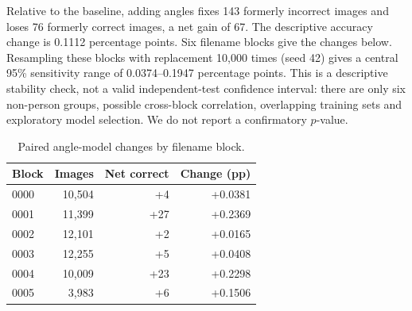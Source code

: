 Relative to the baseline, adding angles fixes 143 formerly incorrect images and loses 76 formerly correct images, a net gain of 67. The descriptive accuracy change is 0.1112 percentage points. Six filename blocks give the changes below. Resampling these blocks with replacement 10,000 times (seed 42) gives a central 95\% sensitivity range of 0.0374--0.1947 percentage points. This is a descriptive stability check, not a valid independent-test confidence interval: there are only six non-person groups, possible cross-block correlation, overlapping training sets and exploratory model selection. We do not report a confirmatory $p$-value.
\begin{table}[h]\centering\caption{Paired angle-model changes by filename block.}\begin{tabular}{lrrr}\toprule
Block & Images & Net correct & Change (pp)\\\midrule
0000 & 10,504 & +4 & +0.0381\\
0001 & 11,399 & +27 & +0.2369\\
0002 & 12,101 & +2 & +0.0165\\
0003 & 12,255 & +5 & +0.0408\\
0004 & 10,009 & +23 & +0.2298\\
0005 & 3,983 & +6 & +0.1506\\\bottomrule\end{tabular}\end{table}
